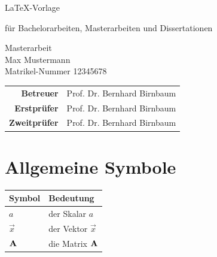 
\pagestyle{empty} %

\clearscrheadings\clearscrplain
\begin{center}
\begin{Huge}
\LaTeX-Vorlage\\
\end{Huge}

\begin{Large}
für Bachelorarbeiten, Masterarbeiten und Dissertationen\\
\end{Large}
\vspace{8mm}
Masterarbeit\\
\vspace{0.4cm}
\vspace{2 cm}
Max Mustermann \\
Matrikel-Nummer 12345678\\
\vspace{8cm}
\begin{tabular}{rl}
{\bfseries Betreuer} & Prof. Dr. Bernhard Birnbaum\\
{\bfseries Erstprüfer}&Prof. Dr. Bernhard Birnbaum\\
{\bfseries Zweitprüfer}&Prof. Dr. Bernhard Birnbaum\\
\end{tabular}

\end{center}
\clearpage


\pagestyle{useheadings} %

\tableofcontents %
\listoffigures %
\listoftables %

\label{s.sym} %
\section*{Allgemeine Symbole}\label{s.sym.alg}
\begin{flushleft}\begin{tabularx}{\textwidth}{l|X}
Symbol & Bedeutung\\\hline
$a$ & der Skalar $a$ \\
$\vec{x}$ & der Vektor $\vec{x}$\\
${\textbf{A}}$ & die Matrix ${\textbf{A}}$\\
\end{tabularx}\end{flushleft}




